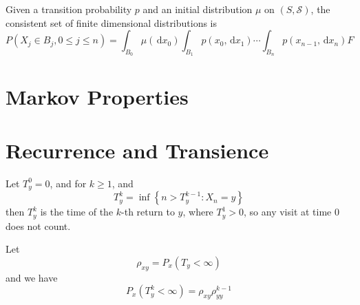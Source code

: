 \begin{remark}
    Given a transition probability $p$ and an initial distribution $\mu$ on $(S,\mathcal{S})$, the consistent set of finite dimensional distributions is
    \begin{equation}
        P\left(X_{j}\in B_{j},0\leq j\leq n\right)=\int_{B_{0}}\mu\left(\,\mathrm{d}x_{0}\right)\int_{B_{1}}p\left(x_{0},\,\mathrm{d}x_{1}\right)\cdots\int_{B_{n}}p\left(x_{n-1},\,\mathrm{d}x_{n}\right)
        F    \end{equation}
\end{remark}

\section{Markov Properties}

\begin{definition}

\end{definition}

\begin{theorem}

\end{theorem}

\begin{corollary}

\end{corollary}

\begin{theorem}

\end{theorem}

\section{Recurrence and Transience}

Let $T_{y}^{0}=0$, and for $k\geq 1$, and
\begin{equation}
    T_{y}^{k}=\inf\left\{n>T_{y}^{k-1}:X_{n}=y\right\}
\end{equation}
then $T_{y}^{k}$ is the time of the $k$-th return to $y$, where $T_{y}^{1}>0$, so any visit at time 0 does not count.

Let
\begin{equation}
    \rho_{x y}=P_{x}\left(T_{y}<\infty\right)
\end{equation}
and we have
\begin{equation}
    P_{x}\left(T_{y}^{k}<\infty\right)=\rho_{xy}\rho_{yy}^{k-1}
\end{equation}

